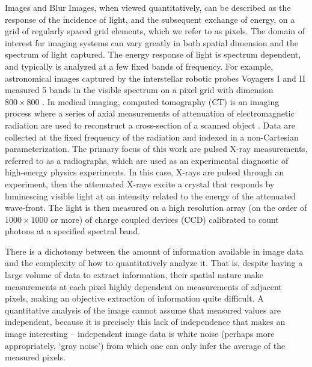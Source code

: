 \begin{chapter}{Images and Blur}
  Images, when viewed quantitatively, can be described as the response of the incidence of light, and the subsequent exchange of energy, on a grid of regularly spaced grid elements, which we refer to as pixels.
  The domain of interest for imaging systems can vary greatly in both spatial dimension and the spectrum of light captured. 
  The energy response of light is spectrum dependent, and typically is analyzed at a few fixed bands of frequency.
  For example, astronomical images captured by the interstellar robotic probes Voyagers I and II measured 5 bands in the visible spectrum on a pixel grid with dimension $800 \times 800$ \citep{voyager}.
  In medical imaging, computed tomography (CT) is an imaging process where a series of axial measurements of attenuation of electromagnetic radiation are used to reconstruct a cross-section of a scanned object \citep{epstein2008}.
  Data are collected at the fixed frequency of the radiation and indexed in a non-Cartesian parameterization.
  The primary focus of this work are pulsed X-ray measurements, referred to as a radiographs, which are used as an experimental diagnostic of high-energy physics experiments.  
  In this case, X-rays are pulsed through an experiment, then the attenuated X-rays excite a crystal that responds by luminescing visible light at an intensity related to the energy of the attenuated wave-front.  
  The light is then measured on a high resolution array (on the order of $1000\times1000$ or more) of charge coupled devices (CCD) calibrated to count photons at a specified spectral band.

There is a dichotomy between the amount of information available in image data and the complexity of how to quantitatively analyze it.
That is, despite having a large volume of data to extract information, their spatial nature make measurements at each pixel highly dependent on measurements of adjacent pixels, making an objective extraction of information quite difficult.
  A quantitative analysis of the image cannot assume that measured values are independent, because it is precisely this lack of independence that makes an image interesting -- independent image data is white noise (perhaps more appropriately, `gray noise') from which one can only infer the average of the measured pixels.


\end{chapter}
